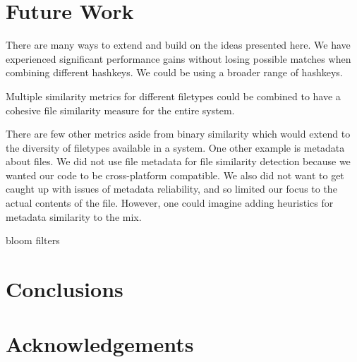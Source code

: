 \documentclass[10pt, twocolumn]{article}
\begin{document}
\section{Future Work}

There are many ways to extend and build on the ideas presented here. We have experienced significant performance gains without losing possible matches when combining different hashkeys. We could be using a broader range of hashkeys.

Multiple similarity metrics for different filetypes could be combined to have a cohesive file similarity measure for the entire system.

There are few other metrics aside from binary similarity which would extend to the diversity of filetypes available in a system. One other example is metadata about files. We did not use file metadata for file similarity detection because we wanted our code to be cross-platform compatible. We also did not want to get caught up with issues of metadata reliability, and so limited our focus to the actual contents of the file. However, one could imagine adding heuristics for metadata similarity to the mix. 

bloom filters

\section{Conclusions}

\section{Acknowledgements}


\end{document}

